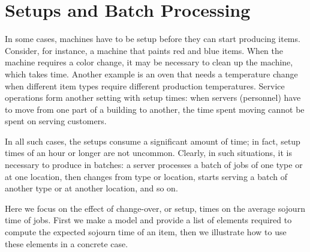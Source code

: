 

\section{Setups and Batch Processing}
\label{sec:setups-batch-proc}

In some cases, machines have to be setup before they can start producing items.
Consider, for instance, a machine that paints red and blue items.
When the machine requires a color change, it may be necessary to clean up the machine, which takes time.
Another example is an oven that needs a temperature change when different item types require different production temperatures.
Service operations form another setting with setup times: when servers (personnel) have to move from one part of a building to another, the time spent moving cannot be spent on serving customers.


In all such cases, the setups consume a significant amount of time; in fact, setup times of an hour or longer are not uncommon.
Clearly, in such situations, it is necessary to produce in batches: a server processes a batch of jobs of one type or at one location, then  changes from type or location, starts serving a batch of another type or at another location, and so on.

Here we focus on the effect of change-over, or setup, times on the average sojourn time of jobs.
First we make a model and provide a list of elements required to compute the expected sojourn time of an item, then we illustrate how to use these elements in a concrete case.


